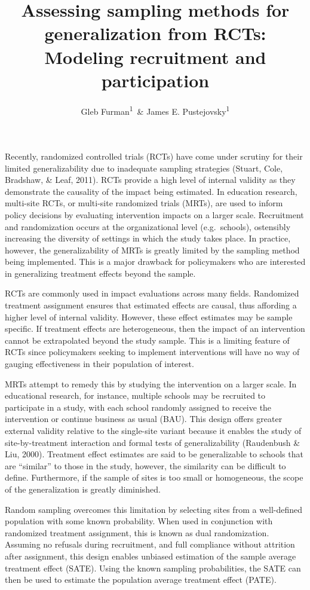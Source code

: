 \documentclass[man,floatsintext]{apa6}
\title{Assessing sampling methods for generalization from RCTs: Modeling
recruitment and participation}
\author{Gleb Furman\textsuperscript{1}~\& James E.
Pustejovsky\textsuperscript{1}}
\date{}
\affiliation{
\vspace{0.5cm}
\textsuperscript{1} University of Texas at Austin}
\theoremstyle{definition}
\theoremstyle{definition}
\theoremstyle{definition}
\theoremstyle{remark}
\begin{document}
\maketitle

Recently, randomized controlled trials (RCTs) have come under scrutiny
for their limited generalizability due to inadequate sampling strategies
(Stuart, Cole, Bradshaw, \& Leaf, 2011). RCTs provide a high level of
internal validity as they demonstrate the causality of the impact being
estimated. In education research, multi-site RCTs, or multi-site
randomized trials (MRTs), are used to inform policy decisions by
evaluating intervention impacts on a larger scale. Recruitment and
randomization occurs at the organizational level (e.g.~schools),
ostensibly increasing the diversity of settings in which the study takes
place. In practice, however, the generalizability of MRTs is greatly
limited by the sampling method being implemented. This is a major
drawback for policymakers who are interested in generalizing treatment
effects beyond the sample.

RCTs are commonly used in impact evaluations across many fields.
Randomized treatment assignment ensures that estimated effects are
causal, thus affording a higher level of internal validity. However,
these effect estimates may be sample specific. If treatment effects are
heterogeneous, then the impact of an intervention cannot be extrapolated
beyond the study sample. This is a limiting feature of RCTs since
policymakers seeking to implement interventions will have no way of
gauging effectiveness in their population of interest.

MRTs attempt to remedy this by studying the intervention on a larger
scale. In educational research, for instance, multiple schools may be
recruited to participate in a study, with each school randomly assigned
to receive the intervention or continue business as usual (BAU). This
design offers greater external validity relative to the single-site
variant because it enables the study of site-by-treatment interaction
and formal tests of generalizability (Raudenbush \& Liu, 2000).
Treatment effect estimates are said to be generalizable to schools that
are \enquote{similar} to those in the study, however, the similarity can
be difficult to define. Furthermore, if the sample of sites is too small
or homogeneous, the scope of the generalization is greatly diminished.

Random sampling overcomes this limitation by selecting sites from a
well-defined population with some known probability. When used in
conjunction with randomized treatment assignment, this is known as dual
randomization. Assuming no refusals during recruitment, and full
compliance without attrition after assignment, this design enables
unbiased estimation of the sample average treatment effect (SATE). Using
the known sampling probabilities, the SATE can then be used to estimate
the population average treatment effect (PATE).
\end{document}
